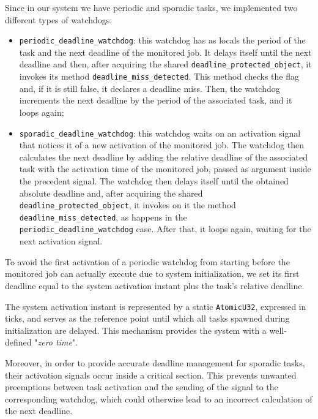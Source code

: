Since in our system we have periodic and sporadic tasks, we implemented two
different types of watchdogs: 
\begin{itemize}
    \item \texttt{periodic\_deadline\_watchdog}: this watchdog has as locals
    the period of the task and the next deadline of the monitored job. It delays
    itself until the next deadline and then, after acquiring the shared
    \texttt{deadline\_protected\_object}, it invokes its method
    \texttt{deadline\_miss\_detected}. This method checks the flag and, if it is
    still false, it declares a deadline miss. Then, the watchdog increments the
    next deadline by the period of the associated task, and it loops again;
    \item \texttt{sporadic\_deadline\_watchdog}: this watchdog waits on an
    activation signal that notices it of a new activation of the monitored job. 
    The watchdog then calculates the next deadline by adding the relative
    deadline of the associated task with the activation time of the monitored
    job, passed as argument inside the precedent signal. The watchdog then
    delays itself until the obtained absolute deadline and, after acquiring the
    shared \texttt{deadline\_protected\_object}, it invokes on it the method 
    \texttt{deadline\_miss\_detected}, as happens in the \\
    \texttt{periodic\_deadline\_watchdog} case. After that, it loops again,
    waiting for the next activation signal.
\end{itemize}

To avoid the first activation of a periodic watchdog from starting before the
monitored job can actually execute due to system initialization, 
we set its first deadline equal to the system activation instant plus the
task's relative deadline. 

The system activation instant is represented by a static \texttt{AtomicU32},
expressed in ticks, and serves as the reference point until which all tasks 
spawned during initialization are delayed. This mechanism provides the system
with a well-defined "\textit{zero time}".

Moreover, in order to provide accurate deadline management
for sporadic tasks, their activation signals occur inside a critical section.
This prevents unwanted preemptions between task activation and the sending
of the signal to the corresponding watchdog, which could otherwise lead to an
incorrect calculation of the next deadline.  